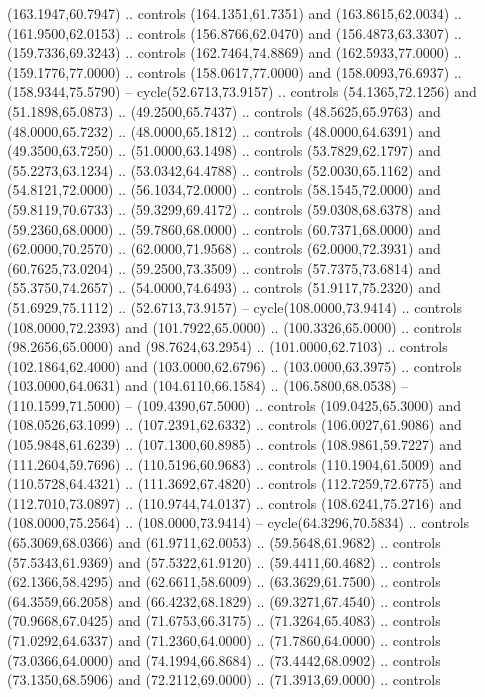   (163.1947,60.7947) .. controls (164.1351,61.7351) and (163.8615,62.0034) ..
  (161.9500,62.0153) .. controls (156.8766,62.0470) and (156.4873,63.3307) ..
  (159.7336,69.3243) .. controls (162.7464,74.8869) and (162.5933,77.0000) ..
  (159.1776,77.0000) .. controls (158.0617,77.0000) and (158.0093,76.6937) ..
  (158.9344,75.5790) -- cycle(52.6713,73.9157) .. controls (54.1365,72.1256) and
  (51.1898,65.0873) .. (49.2500,65.7437) .. controls (48.5625,65.9763) and
  (48.0000,65.7232) .. (48.0000,65.1812) .. controls (48.0000,64.6391) and
  (49.3500,63.7250) .. (51.0000,63.1498) .. controls (53.7829,62.1797) and
  (55.2273,63.1234) .. (53.0342,64.4788) .. controls (52.0030,65.1162) and
  (54.8121,72.0000) .. (56.1034,72.0000) .. controls (58.1545,72.0000) and
  (59.8119,70.6733) .. (59.3299,69.4172) .. controls (59.0308,68.6378) and
  (59.2360,68.0000) .. (59.7860,68.0000) .. controls (60.7371,68.0000) and
  (62.0000,70.2570) .. (62.0000,71.9568) .. controls (62.0000,72.3931) and
  (60.7625,73.0204) .. (59.2500,73.3509) .. controls (57.7375,73.6814) and
  (55.3750,74.2657) .. (54.0000,74.6493) .. controls (51.9117,75.2320) and
  (51.6929,75.1112) .. (52.6713,73.9157) -- cycle(108.0000,73.9414) .. controls
  (108.0000,72.2393) and (101.7922,65.0000) .. (100.3326,65.0000) .. controls
  (98.2656,65.0000) and (98.7624,63.2954) .. (101.0000,62.7103) .. controls
  (102.1864,62.4000) and (103.0000,62.6796) .. (103.0000,63.3975) .. controls
  (103.0000,64.0631) and (104.6110,66.1584) .. (106.5800,68.0538) --
  (110.1599,71.5000) -- (109.4390,67.5000) .. controls (109.0425,65.3000) and
  (108.0526,63.1099) .. (107.2391,62.6332) .. controls (106.0027,61.9086) and
  (105.9848,61.6239) .. (107.1300,60.8985) .. controls (108.9861,59.7227) and
  (111.2604,59.7696) .. (110.5196,60.9683) .. controls (110.1904,61.5009) and
  (110.5728,64.4321) .. (111.3692,67.4820) .. controls (112.7259,72.6775) and
  (112.7010,73.0897) .. (110.9744,74.0137) .. controls (108.6241,75.2716) and
  (108.0000,75.2564) .. (108.0000,73.9414) -- cycle(64.3296,70.5834) .. controls
  (65.3069,68.0366) and (61.9711,62.0053) .. (59.5648,61.9682) .. controls
  (57.5343,61.9369) and (57.5322,61.9120) .. (59.4411,60.4682) .. controls
  (62.1366,58.4295) and (62.6611,58.6009) .. (63.3629,61.7500) .. controls
  (64.3559,66.2058) and (66.4232,68.1829) .. (69.3271,67.4540) .. controls
  (70.9668,67.0425) and (71.6753,66.3175) .. (71.3264,65.4083) .. controls
  (71.0292,64.6337) and (71.2360,64.0000) .. (71.7860,64.0000) .. controls
  (73.0366,64.0000) and (74.1994,66.8684) .. (73.4442,68.0902) .. controls
  (73.1350,68.5906) and (72.2112,69.0000) .. (71.3913,69.0000) .. controls
